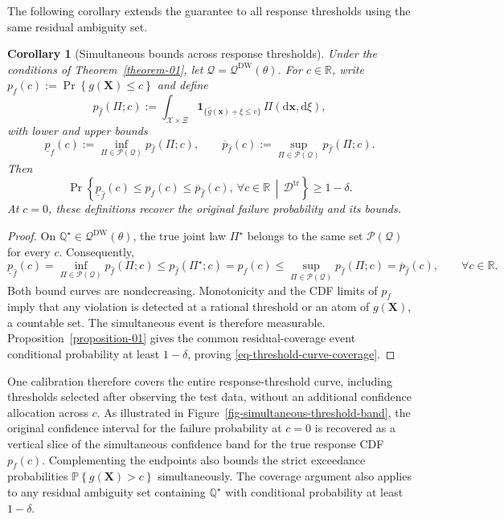 \documentclass[review,11pt,3p,authoryear,nopreprintline]{elsarticle}
\newtheorem{corollary}{Corollary}
\begin{document}
The following corollary extends the guarantee to all response thresholds using the same residual ambiguity set.

\begin{corollary}[Simultaneous bounds across response thresholds]
  \label{cor-simultaneous-threshold-bounds}
  Under the conditions of Theorem~\ref{theorem-01}, let $\mathcal Q=\mathcal Q^{\mathrm{DW}}(\theta)$. For $c\in\mathbb R$, write $p_f(c):=\Pr \left\{g(\bm X)\le c\right\}$ and define
  \[
    p_{\hat f}(\Pi;c):=\int_{\mathcal X\times\Xi}
      \mathbf1_{\{\hat g(\bm x)+\xi\le c\}}\,\Pi(\mathrm d\bm x,\mathrm d\xi),
  \]
  with lower and upper bounds
  \[
    \underline p_{\hat f}(c):=\inf_{\Pi\in\mathcal P(\mathcal Q)}p_{\hat f}(\Pi;c),
    \qquad
    \overline p_{\hat f}(c):=\sup_{\Pi\in\mathcal P(\mathcal Q)}p_{\hat f}(\Pi;c).
  \]
  Then
  \begin{equation}
    \Pr\left\{\underline p_{\hat f}(c)\le p_f(c)\le\overline p_{\hat f}(c),
      \ \forall c\in\mathbb R\,\middle|\,\mathcal D^{\mathrm{tr}}\right\}\ge1-\delta.
    \label{eq-threshold-curve-coverage}
  \end{equation}
  At $c=0$, these definitions recover the original failure probability and its bounds.
\end{corollary}
\begin{proof}
  On $\mathbb Q^\star\in\mathcal Q^{\mathrm{DW}}(\theta)$, the true joint law $\Pi^\star$ belongs to the same set $\mathcal P(\mathcal Q)$ for every $c$. Consequently,
  \[ 
    \underline p_{\hat f}(c) =\inf_{\Pi\in\mathcal P(\mathcal Q)} p_{\hat f}(\Pi;c) \le p_{\hat f}(\Pi^\star;c) =p_f(c) \le\sup_{\Pi\in\mathcal P(\mathcal Q)} p_{\hat f}(\Pi;c) =\overline p_{\hat f}(c), \qquad\forall c\in\mathbb R.
  \]
  Both bound curves are nondecreasing. Monotonicity and the CDF limits of $p_f$ imply that any violation is detected at a rational threshold or an atom of $g(\bm X)$, a countable set. The simultaneous event is therefore measurable. Proposition~\ref{proposition-01} gives the common residual-coverage event conditional probability at least $1-\delta$, proving \eqref{eq-threshold-curve-coverage}.
\end{proof}

One calibration therefore covers the entire response-threshold curve, including thresholds selected after observing the test data, without an additional confidence allocation across $c$. As illustrated in Figure~\ref{fig-simultaneous-threshold-band}, the original confidence interval for the failure probability at $c=0$ is recovered as a vertical slice of the simultaneous confidence band for the true response CDF $p_f(c)$. Complementing the endpoints also bounds the strict exceedance probabilities $\mathbb P\left\{g(\bm X)>c\right\}$ simultaneously. The coverage argument also applies to any residual ambiguity set containing $\mathbb Q^\star$ with conditional probability at least $1-\delta$.
\end{document}
